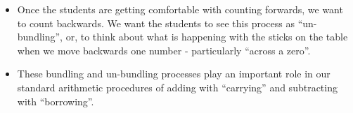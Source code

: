 \documentclass{ximera}
\begin{document}
\begin{instructorNotes}
\begin{itemize}
	\item Once the students are getting comfortable with counting forwards, we want to count backwards.  We want the students to see this process as ``un-bundling'', or, to think about what is happening with the sticks on the table when we move backwards one number - particularly ``across a zero''. 
	\item These bundling and un-bundling processes play an important role in our standard arithmetic procedures of adding with ``carrying'' and subtracting with ``borrowing''. 
\end{itemize}







\end{instructorNotes}
\end{document}
